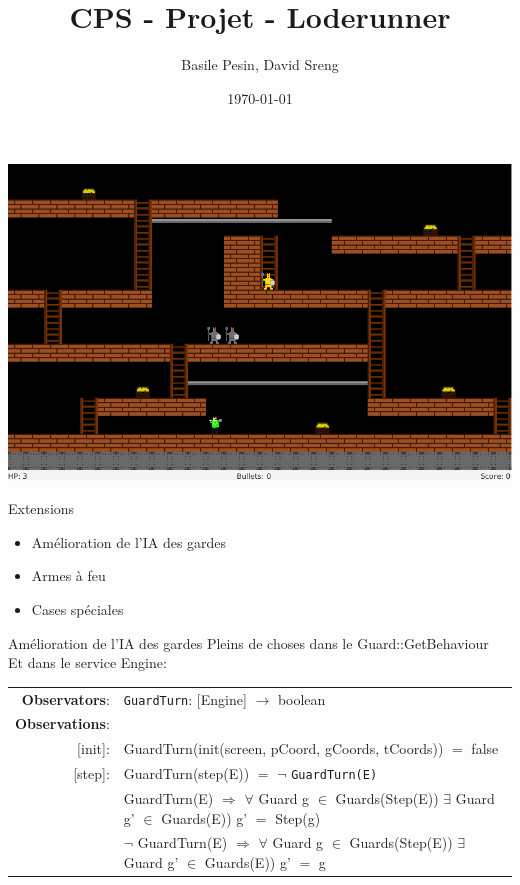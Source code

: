 \documentclass[aspectratio=169]{beamer}
\title{CPS - Projet - Loderunner}
\date{\today}
\author{Basile Pesin, David Sreng}
\institute{Faculté des Sciences de Sorbonne Université}
\begin{document}
\maketitle

\begin{frame}
  \begin{center}
    \includegraphics[height=0.7\paperheight]{assets/game.png}
  \end{center}
\end{frame}

\begin{frame}{Extensions}
  \begin{itemize}
    \item Amélioration de l'IA des gardes
    \item Armes à feu
    \item Cases spéciales
  \end{itemize}
\end{frame}

\changefontsizes{6pt}

\begin{frame}{Amélioration de l'IA des gardes}
  Pleins de choses dans le \textrm{Guard::GetBehaviour}\\

  Et dans le service \textrm{Engine}:
\begin{longtable}{rl}
  \textbf{Observators}:&\texttt{GuardTurn}: \textrm{[Engine]} $\rightarrow$ \textrm{boolean}\\
  \textbf{Observations}:&\\
  \textrm{[init]}:& \textrm{GuardTurn(init(screen, pCoord, gCoords, tCoords))} $=$ \textrm{false}\\
  \textrm{[step]}:& \textrm{GuardTurn(step(E))} $=$ $\neg$ \texttt{GuardTurn(E)}\\
  & \textrm{GuardTurn(E)} $\Rightarrow$ $\forall$ \textrm{Guard} g $\in$ \textrm{Guards(Step(E))} $\exists$ \textrm{Guard} g' $\in$ \textrm{Guards(E))} g' $=$ \textrm{Step(g)}\\
  & $\neg$ \textrm{GuardTurn(E)} $\Rightarrow$ $\forall$ \textrm{Guard} g $\in$ \textrm{Guards(Step(E))} $\exists$ \textrm{Guard} g' $\in$ \textrm{Guards(E))} g' $=$ \textrm{g}\\
\end{longtable}
\end{frame}
\end{document}
